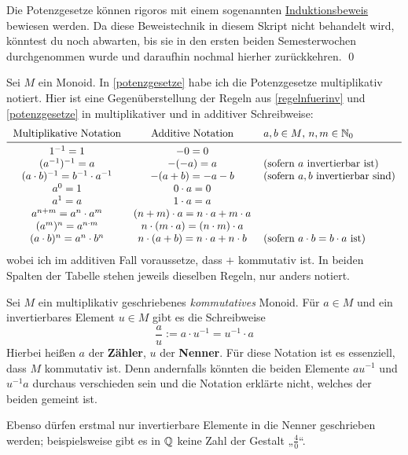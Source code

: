     
\begin{bew}
    Die Potenzgesetze können rigoros mit einem sogenannten \href{https://de.wikipedia.org/wiki/Vollst\%C3\%A4ndige_Induktion}{Induktionsbeweis} bewiesen werden. Da diese Beweistechnik in diesem Skript nicht behandelt wird, könntest du noch abwarten, bis sie in den ersten beiden Semesterwochen durchgenommen wurde und daraufhin nochmal hierher zurückkehren. \qed
\end{bew}


\begin{bem}[*]
    Sei $M$ ein Monoid. In \cref{potenzgesetze} habe ich die Potenzgesetze multiplikativ notiert. Hier ist eine Gegenüberstellung der Regeln aus \cref{regelnfuerinv} und \cref{potenzgesetze} in multiplikativer und in additiver Schreibweise:
    \[\begin{tabular}{ccl}
        Multiplikative Notation & Additive Notation & $a,b\in M$,\ $n,m\in \N_0$\\
        \midrule
        $1^{-1} = 1$ & $-0=0$ & \\
        $(a^{-1})^{-1} = a$ & $-(-a)=a$ & (sofern $a$ invertierbar ist) \\
        $(a\cdot b)^{-1} = b^{-1}\cdot a^{-1}$ & $-(a+b) = -a - b$ & (sofern $a,b$ invertierbar sind) \\
        $a^0 = 1$ & $0\cdot a = 0$ & \\
        $a^1 = a$ & $1\cdot a=a$ &\\
        $a^{n+m} = a^n\cdot a^m$ & $(n+m)\cdot a = n\cdot a + m\cdot a$ & \\
        $(a^m)^n = a^{n\cdot m}$ & $n\cdot (m\cdot a) = (n\cdot m)\cdot a$ & \\
        $(a\cdot b)^n =a^n\cdot b^n$ & $n\cdot (a+b) = n\cdot a+n\cdot b$ & (sofern $a\cdot b=b\cdot a$ ist)
    \end{tabular}\]
    wobei ich im additiven Fall voraussetze, dass $+$ kommutativ ist. In beiden Spalten der Tabelle stehen jeweils dieselben Regeln, nur anders notiert.
\end{bem}


\begin{nota}[* Bruchschreibweise]  
    Sei $M$ ein multiplikativ geschriebenes \emph{kommutatives} Monoid. Für $a\in M$ und ein invertierbares Element $u\in M$ gibt es die Schreibweise
        \[ \frac{a}{u} := a\cdot u^{-1} = u^{-1} \cdot a\]
    Hierbei heißen $a$ der \textbf{Zähler}, $u$ der \textbf{Nenner}. Für diese Notation ist es essenziell, dass $M$ kommutativ ist. Denn andernfalls könnten die beiden Elemente $au^{-1}$ und $u^{-1}a$ durchaus verschieden sein und die Notation erklärte nicht, welches der beiden gemeint ist.
    
    Ebenso dürfen erstmal nur invertierbare Elemente in die Nenner geschrieben werden; beispielsweise gibt es in $\mathbb Q$ keine Zahl der Gestalt „$\frac{4}{0}$“.
\end{nota}


